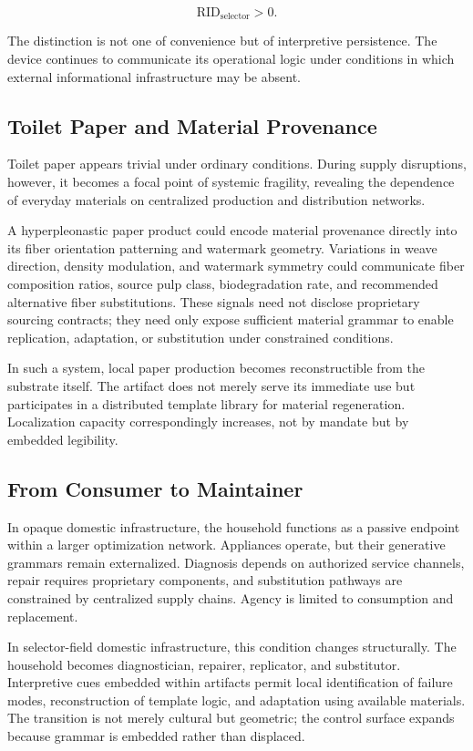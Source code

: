 \documentclass[11pt]{article}
\begin{document}
\[
\text{RID}_{\text{selector}} > 0.
\]

The distinction is not one of convenience but of interpretive
persistence. The device continues to communicate its operational logic
under conditions in which external informational infrastructure may be
absent.

\subsection{Toilet Paper and Material Provenance}

Toilet paper appears trivial under ordinary conditions. During supply
disruptions, however, it becomes a focal point of systemic fragility,
revealing the dependence of everyday materials on centralized
production and distribution networks.

A hyperpleonastic paper product could encode material provenance
directly into its fiber orientation patterning and watermark geometry.
Variations in weave direction, density modulation, and watermark
symmetry could communicate fiber composition ratios, source pulp class,
biodegradation rate, and recommended alternative fiber substitutions.
These signals need not disclose proprietary sourcing contracts; they
need only expose sufficient material grammar to enable replication,
adaptation, or substitution under constrained conditions.

In such a system, local paper production becomes reconstructible from
the substrate itself. The artifact does not merely serve its immediate
use but participates in a distributed template library for material
regeneration. Localization capacity correspondingly increases, not by
mandate but by embedded legibility.

\subsection{From Consumer to Maintainer}

In opaque domestic infrastructure, the household functions as a passive
endpoint within a larger optimization network. Appliances operate, but
their generative grammars remain externalized. Diagnosis depends on
authorized service channels, repair requires proprietary components,
and substitution pathways are constrained by centralized supply chains.
Agency is limited to consumption and replacement.

In selector-field domestic infrastructure, this condition changes
structurally. The household becomes diagnostician, repairer, replicator,
and substitutor. Interpretive cues embedded within artifacts permit
local identification of failure modes, reconstruction of template logic,
and adaptation using available materials. The transition is not merely
cultural but geometric; the control surface expands because grammar is
embedded rather than displaced.
\end{document}
